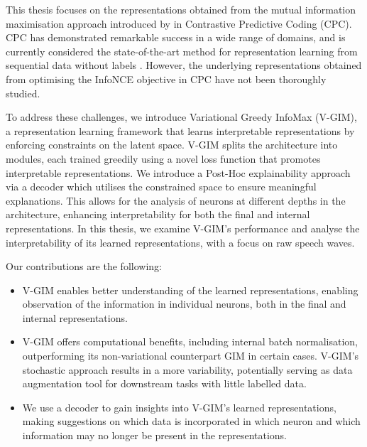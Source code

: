 This thesis focuses on the representations obtained from the mutual information maximisation approach introduced by \cite{oordRepresentationLearningContrastive2019} in Contrastive Predictive Coding (CPC). CPC has demonstrated remarkable success in a wide range of domains, and is currently considered the state-of-the-art method for representation learning from sequential data without labels \citep{stackeEvaluationContrastivePredictive2020, dehaanContrastivePredictiveCoding2021, luSemiSupervisedHistologyClassification2019, bhatiSegmentalContrastivePredictive2021, deldariTimeSeriesChange2021, henaffDataEfficientImageRecognition2020}. However, the underlying representations obtained from optimising the InfoNCE objective in CPC have not been thoroughly studied.

To address these challenges, we introduce Variational Greedy InfoMax (V-GIM), a representation learning framework that learns interpretable representations by enforcing constraints on the latent space. V-GIM splits the architecture into modules, each trained greedily using a novel loss function that promotes interpretable representations. We introduce a Post-Hoc explainability approach via a decoder which utilises the constrained space to ensure meaningful explanations. This allows for the analysis of neurons at different depths in the architecture, enhancing interpretability for both the final and internal representations. In this thesis, we examine V-GIM's performance and analyse the interpretability of its learned representations, with a focus on raw speech waves.



Our contributions are the following:
\begin{itemize}
	\item V-GIM enables better understanding of the learned representations, enabling observation of the information in individual neurons, both in the final and internal representations. %
	\item V-GIM offers computational benefits, including internal batch normalisation, outperforming its non-variational counterpart GIM in certain cases. V-GIM's stochastic approach results in a more variability, potentially serving as data augmentation tool for downstream tasks with little labelled data.
	\item We use a decoder to gain insights into V-GIM's learned representations, making suggestions on which data is incorporated in which neuron and which information may no longer be present in the representations.
\end{itemize}




